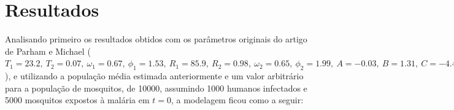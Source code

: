 \documentclass[12pt]{article}
\begin{document}
\section{Resultados}

Analisando primeiro os resultados obtidos com os parâmetros originais do artigo de Parham e Michael ($T_1=23.2, \ T_2=0.07, \ \omega_1=0.67, \ \phi_1=1.53, \ R_1=85.9, \ R_2=0.98, \ \omega_2=0.65, \ \phi_2=1.99, \ A=-0.03, \ B=1.31, \ C=-4.4, \ b_1=0.04, \ b_2 = 0.09, \ T_{min}=14.5, \ \gamma= 1/120,\ R_L = 50, \ c_1=0.00554, \ c_2=-0.06737$), e utilizando a população média estimada anteriormente e um valor arbitrário para a população de mosquitos, de 10000, assumindo 1000 humanos infectados e 5000 mosquitos expostos à malária em $t=0$, a modelagem ficou como a seguir: 


\end{document}

